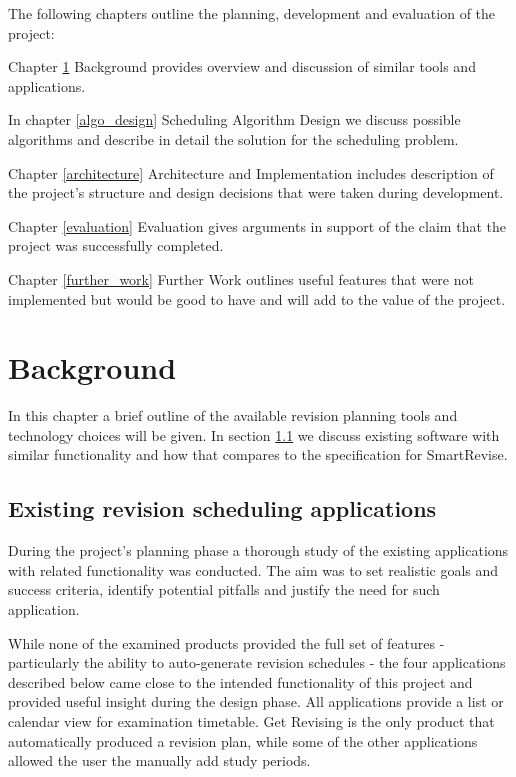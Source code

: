 \documentclass[bsc,frontabs,twoside,singlespacing,parskip]{infthesis}     %
\begin{document}
		The following chapters outline the planning, development and evaluation of the project:

		\begin{compactitem}
			\item Chapter \ref{background} Background provides overview and discussion of similar tools and applications.
			\item In chapter \ref{algo_design} Scheduling Algorithm Design we discuss possible algorithms and describe in detail the solution for the scheduling problem.
			\item Chapter \ref{architecture} Architecture and Implementation includes description of the project's structure and design decisions that were taken during development.
			\item Chapter \ref{evaluation} Evaluation gives arguments in support of the claim that the project was successfully completed.
			\item Chapter \ref{further_work} Further Work outlines useful features that were not implemented but would be good to have and will add to the value of the project.
		\end{compactitem}



\chapter{Background}\label{background}
		In this chapter a brief outline of the available revision planning tools and technology choices will be given.
		In section \ref{apps} we discuss existing software with similar functionality and how that compares to the specification for SmartRevise.


	\section{Existing revision scheduling applications}\label{apps}

		During the project's planning phase a thorough study of the existing applications with related functionality was conducted. The aim was to set realistic goals and success criteria, identify potential pitfalls and justify the need for such application.

		While none of the examined products provided the full set of features - particularly the ability to auto-generate revision schedules - the four applications described below came close to the intended functionality of this project and provided useful insight during the design phase. All applications provide a list or calendar view for examination timetable. Get Revising is the only product that automatically produced a revision plan, while some of the other applications allowed the user the manually add study periods.
\end{document}
